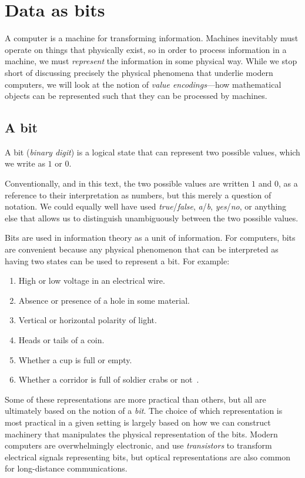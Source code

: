 \chapter{Data as bits}
\label{chap:bits}

A computer is a machine for transforming information.  Machines
inevitably must operate on things that physically exist, so in order
to process information in a machine, we must \emph{represent} the
information in some physical way.  While we stop short of discussing
precisely the physical phenomena that underlie modern computers, we
will look at the notion of \emph{value encodings}---how mathematical
objects can be represented such that they can be processed by
machines.

\section{A bit}
\label{sec:bit}

\begin{definition}[Bit]
  A bit (\emph{binary digit}) is a logical state that can represent two possible values,
  which we write as $1$ or $0$.
\end{definition}

Conventionally, and in this text, the two possible values are written
$1$ and $0$, as a reference to their interpretation as numbers, but
this merely a question of notation.  We could equally well have used
\emph{true}/\emph{false}, \emph{a}/\emph{b}, \emph{yes}/\emph{no}, or
anything else that allows us to distinguish unambiguously between the
two possible values.

Bits are used in information theory as a unit of information.  For
computers, bits are convenient because any physical phenomenon that
can be interpreted as having two states can be used to represent a
bit.  For example:
\begin{enumerate}
\item High or low voltage in an electrical wire.
\item Absence or presence of a hole in some material.
\item Vertical or horizontal polarity of light.
\item Heads or tails of a coin.
\item Whether a cup is full or empty.
\item Whether a corridor is full of soldier crabs or
  not~\cite{gunji2011robust}.
\end{enumerate}
Some of these representations are more practical than others, but all
are ultimately based on the notion of a \emph{bit}.  The choice of
which representation is most practical in a given setting is largely
based on how we can construct machinery that manipulates the physical
representation of the bits.  Modern computers are overwhelmingly
electronic, and use \emph{transistors} to transform electrical signals
representing bits, but optical representations are also common for
long-distance communications.

